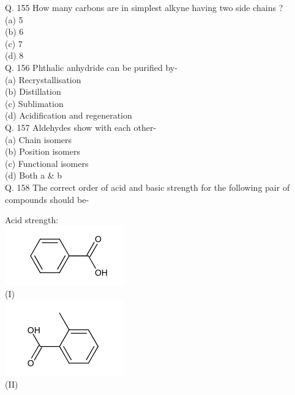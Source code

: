 \documentclass[10pt]{article}
\begin{document}
Q. 155 How many carbons are in simplest alkyne having two side chains ?\\
(a) 5\\
(b) 6\\
(c) 7\\
(d) 8\\
Q. 156 Phthalic anhydride can be purified by-\\
(a) Recrystallisation\\
(b) Distillation\\
(c) Sublimation\\
(d) Acidification and regeneration\\
Q. 157 Aldehydes show with each other-\\
(a) Chain isomers\\
(b) Position isomers\\
(c) Functional isomers\\
(d) Both a \& b\\
Q. 158 The correct order of acid and basic strength for the following pair of compounds should be-

Acid strength:\\
\includegraphics{smile-ec1f3d3d7da5eec06fc18d669b58731e4ed32d85}\\
(I)\\
\includegraphics{smile-6172d2fd1ec09d68505d8260df37b712d870c33d}\\
(II)
\end{document}
